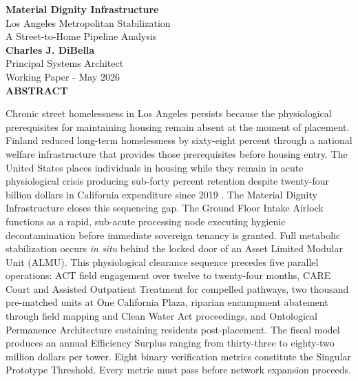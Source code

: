 \documentclass[12pt, letterpaper]{article}
\begin{document}
\captionsetup[table]{labelfont=normalfont, labelsep=period, skip=6pt}

\begin{titlepage}
\begin{center}
{\LARGE \textbf{Material Dignity Infrastructure}}\\[6pt]
{\large Los Angeles Metropolitan Stabilization\\[2pt]
A Street-to-Home Pipeline Analysis}\\[1.0cm]
{\normalsize \textbf{Charles J. DiBella}}\\[0.01cm]
{\normalsize Principal Systems Architect}\\[0.01cm]
{\normalsize Working Paper - May 2026}\\[0.5cm]
\textbf{ABSTRACT}
\vspace{0.5cm}
\end{center}
\begin{minipage}{0.95\textwidth}
\noindent

Chronic street homelessness in Los Angeles persists because the physiological prerequisites for maintaining housing remain absent at the moment of placement. Finland reduced long-term homelessness by sixty-eight percent through a national welfare infrastructure that provides those prerequisites before housing entry. The United States places individuals in housing while they remain in acute physiological crisis producing sub-forty percent retention despite twenty-four billion dollars in California expenditure since 2019 \citep{ucsf_bhhi_2023}. The Material Dignity Infrastructure closes this sequencing gap. The Ground Floor Intake Airlock functions as a rapid, sub-acute processing node executing hygienic decontamination before immediate sovereign tenancy is granted. Full metabolic stabilization occurs \textit{in situ} behind the locked door of an Asset Limited Modular Unit (ALMU). This physiological clearance sequence precedes five parallel operations: ACT field engagement over twelve to twenty-four months, CARE Court and Assisted Outpatient Treatment for compelled pathways, two thousand pre-matched units at One California Plaza, riparian encampment abatement through field mapping and Clean Water Act proceedings, and Ontological Permanence Architecture sustaining residents post-placement. The fiscal model produces an annual Efficiency Surplus ranging from thirty-three to eighty-two million dollars per tower. Eight binary verification metrics constitute the Singular Prototype Threshold. Every metric must pass before network expansion proceeds.
\end{minipage}
\end{titlepage}
\end{document}
